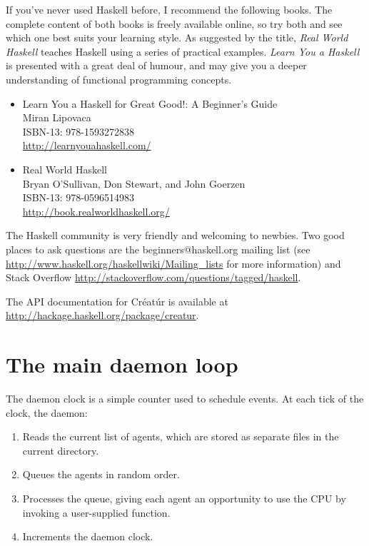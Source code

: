 \documentclass[a4paper,10pt]{report}
\begin{document}
If you've never used Haskell before, I recommend the following
books.
The complete content of both books is freely available online,
so try both and see which one best suits your learning style.
As suggested by the title, \emph{Real World Haskell} teaches
Haskell using a series of practical examples.
\emph{Learn You a Haskell} is presented with a great deal of humour,
and may give you a deeper understanding of functional programming
concepts.

\begin{itemize}
\item Learn You a Haskell for Great Good!: A Beginner's Guide \\
Miran Lipovaca \\
ISBN-13: 978-1593272838 \\
\url{http://learnyouahaskell.com/}

\item Real World Haskell \\
Bryan O'Sullivan, Don Stewart, and John Goerzen \\
ISBN-13: 978-0596514983 \\
\url{http://book.realworldhaskell.org/}
\end {itemize}


The Haskell community is very friendly and welcoming to newbies.
Two good places to ask questions are 
the beginners@haskell.org mailing list
(see \url{http://www.haskell.org/haskellwiki/Mailing_lists} 
for more information)
and Stack Overflow \url{http://stackoverflow.com/questions/tagged/haskell}.

The API documentation for Créatúr is available at 
\url{http://hackage.haskell.org/package/creatur}.

\chapter{The main daemon loop}
\label{sec:daemon}

The daemon clock is a simple counter used to schedule events.
At each tick of the clock, the daemon:

\begin{enumerate}
\item Reads the current list of agents, which are stored as separate files in
the current directory.
\item Queues the agents in random order.
\item Processes the queue, giving each agent an opportunity
to use the CPU by invoking a user-supplied function.
\item Increments the daemon clock.
\end {enumerate}
\end{document}
